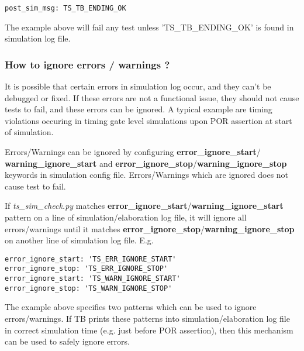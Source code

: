 \documentclass{tropic_design_spec}
\begin{document}
\begin{lstlisting}
post_sim_msg: TS_TB_ENDING_OK
\end{lstlisting}

The example above will fail any test unless 'TS_TB_ENDING_OK' is found in simulation
log file.


\subsubsection{How to ignore errors / warnings ?}
\label{sec:how-to-ignore-errors-warnings}

It is possible that certain errors in simulation log occur, and they can't be debugged or
fixed. If these errors are not a functional issue, they should not cause tests to fail,
and these errors can be ignored. A typical example are timing violations occuring in
timing gate level simulations upon POR assertion at start of simulation.

Errors/Warnings can be ignored by configuring \textbf{error_ignore_start}/
\textbf{warning_ignore_start} and \textbf{error_ignore_stop}/\textbf{warning_ignore_stop}
keywords in simulation config file. Errors/Warnings which are ignored does not cause
test to fail.

If \textit{ts_sim_check.py} matches \textbf{error_ignore_start}/\textbf{warning_ignore_start}
pattern on a line of simulation/elaboration log file, it will ignore all errors/warnings
until it matches \textbf{error_ignore_stop}/\textbf{warning_ignore_stop} on another line
of simulation log file. E.g.

\begin{lstlisting}
error_ignore_start: 'TS_ERR_IGNORE_START'
error_ignore_stop: 'TS_ERR_IGNORE_STOP'
error_ignore_start: 'TS_WARN_IGNORE_START'
error_ignore_stop: 'TS_WARN_IGNORE_STOP'
\end{lstlisting}

The example above specifies two patterns which can be used to ignore errors/warnings.
If TB prints these patterns into simulation/elaboration log file in correct simulation time (e.g.
just before POR assertion), then this mechanism can be used to safely ignore errors.

\end{document}
